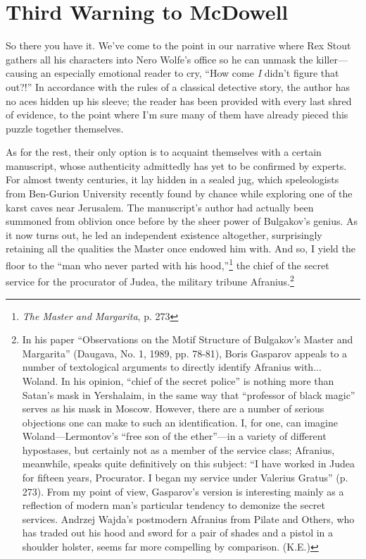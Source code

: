\chapter*[(Red Card)]{Third Warning to McDowell}


So there you have it. We've come to the point in our narrative where Rex Stout gathers all his characters into Nero Wolfe's office so he can unmask the killer---causing an especially emotional reader to cry, ``How come \emph{I} didn't figure that out?!'' In accordance with the rules of a classical detective story, the author has no aces hidden up his sleeve; the reader has been provided with every last shred of evidence, to the point where I'm sure many of them have already pieced this puzzle together themselves.

As for the rest, their only option is to acquaint themselves with a certain manuscript, whose authenticity admittedly has yet to be confirmed by experts. For almost twenty centuries, it lay hidden in a sealed jug, which speleologists from Ben-Gurion University recently found by chance while exploring one of the karst caves near Jerusalem. The manuscript's author had actually been summoned from oblivion once before by the sheer power of Bulgakov's genius. As it now turns out, he led an independent existence altogether, surprisingly retaining all the qualities the Master once endowed him with. And so, I yield the floor to the ``man who never parted with his hood,''\footnote{\emph{The Master and Margarita}, p. 273} the chief of the secret service for the procurator of Judea, the military tribune Afranius.\footnote{In his paper ``Observations on the Motif Structure of Bulgakov's Master and Margarita'' (Daugava, No. 1, 1989, pp. 78-81), Boris Gasparov appeals to a number of textological arguments to directly identify Afranius with... Woland. In his opinion, ``chief of the secret police'' is nothing more than Satan's mask in Yershalaim, in the same way that ``professor of black magic'' serves as his mask in Moscow. However, there are a number of serious objections one can make to such an identification. I, for one, can imagine Woland---Lermontov's ``free son of the ether''---in a variety of different hypostases, but certainly not as a member of the service class; Afranius, meanwhile, speaks quite definitively on this subject: ``I have worked in Judea for fifteen years, Procurator. I began my service under Valerius Gratus'' (p. 273). From my point of view, Gasparov's version is interesting mainly as a reflection of modern man's particular tendency to demonize the secret services. Andrzej Wajda's postmodern Afranius from Pilate and Others, who has traded out his hood and sword for a pair of shades and a pistol in a shoulder holster, seems far more compelling by comparison. (K.E.)}